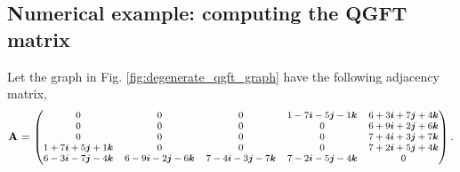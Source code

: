 \vspace{-1em}
\subsection{Numerical example: computing the QGFT matrix}

Let the graph in Fig. \ref{fig:degenerate_qgft_graph} have the following adjacency matrix,
\begin{equation*}
    \footnotesize
    \mathbf{A} = \begin{pmatrix}
        0                   & 0                   & 0                   & 1 -7\boldsymbol{i} -5\boldsymbol{j} -1\boldsymbol{k} & 6 +3\boldsymbol{i} +7\boldsymbol{j} +4\boldsymbol{k} \\
        0                   & 0                   & 0                   & 0                   & 6 +9\boldsymbol{i} +2\boldsymbol{j} +6\boldsymbol{k} \\
        0                   & 0                   & 0                   & 0                   & 7 +4\boldsymbol{i} +3\boldsymbol{j} +7\boldsymbol{k} \\
        1 +7\boldsymbol{i} +5\boldsymbol{j} +1\boldsymbol{k} & 0                   & 0                   & 0                   & 7 +2\boldsymbol{i} +5\boldsymbol{j} +4\boldsymbol{k} \\
        6 -3\boldsymbol{i} -7\boldsymbol{j} -4\boldsymbol{k} & 6 -9\boldsymbol{i} -2\boldsymbol{j} -6\boldsymbol{k} & 7 -4\boldsymbol{i} -3\boldsymbol{j} -7\boldsymbol{k} & 7 -2\boldsymbol{i} -5\boldsymbol{j} -4\boldsymbol{k} & 0                   \\
    \end{pmatrix}.
\end{equation*}

